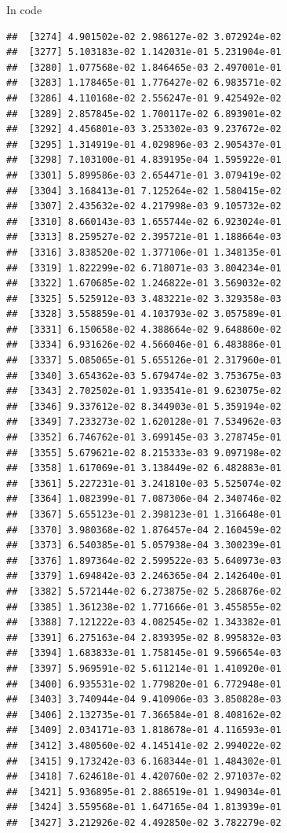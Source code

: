 \documentclass[ignorenonframetext,]{beamer}
\begin{document}
\begin{frame}[fragile]{In code}
\begin{verbatim}
##  [3274] 4.901502e-02 2.986127e-02 3.072924e-02
##  [3277] 5.103183e-02 1.142031e-01 5.231904e-01
##  [3280] 1.077568e-02 1.846465e-03 2.497001e-01
##  [3283] 1.178465e-01 1.776427e-02 6.983571e-02
##  [3286] 4.110168e-02 2.556247e-01 9.425492e-02
##  [3289] 2.857845e-02 1.700117e-02 6.893901e-02
##  [3292] 4.456801e-03 3.253302e-03 9.237672e-02
##  [3295] 1.314919e-01 4.029896e-03 2.905437e-01
##  [3298] 7.103100e-01 4.839195e-04 1.595922e-01
##  [3301] 5.899586e-03 2.654471e-01 3.079419e-02
##  [3304] 3.168413e-01 7.125264e-02 1.580415e-02
##  [3307] 2.435632e-02 4.217998e-03 9.105732e-02
##  [3310] 8.660143e-03 1.655744e-02 6.923024e-01
##  [3313] 8.259527e-02 2.395721e-01 1.188664e-03
##  [3316] 3.838520e-02 1.377106e-01 1.348135e-01
##  [3319] 1.822299e-02 6.718071e-03 3.804234e-01
##  [3322] 1.670685e-02 1.246822e-01 3.569032e-02
##  [3325] 5.525912e-03 3.483221e-02 3.329358e-03
##  [3328] 3.558859e-01 4.103793e-02 3.057589e-01
##  [3331] 6.150658e-02 4.388664e-02 9.648860e-02
##  [3334] 6.931626e-02 4.566046e-01 6.483886e-01
##  [3337] 5.085065e-01 5.655126e-01 2.317960e-01
##  [3340] 3.654362e-03 5.679474e-02 3.753675e-03
##  [3343] 2.702502e-01 1.933541e-01 9.623075e-02
##  [3346] 9.337612e-02 8.344903e-01 5.359194e-02
##  [3349] 7.233273e-02 1.620128e-01 7.534962e-03
##  [3352] 6.746762e-01 3.699145e-03 3.278745e-01
##  [3355] 5.679621e-02 8.215333e-03 9.097198e-02
##  [3358] 1.617069e-01 3.138449e-02 6.482883e-01
##  [3361] 5.227231e-01 3.241810e-03 5.525074e-02
##  [3364] 1.082399e-01 7.087306e-04 2.340746e-02
##  [3367] 5.655123e-01 2.398123e-01 1.316648e-01
##  [3370] 3.980368e-02 1.876457e-04 2.160459e-02
##  [3373] 6.540385e-01 5.057938e-04 3.300239e-01
##  [3376] 1.897364e-02 2.599522e-03 5.640973e-03
##  [3379] 1.694842e-03 2.246365e-04 2.142640e-01
##  [3382] 5.572144e-02 6.273875e-02 5.286876e-02
##  [3385] 1.361238e-02 1.771666e-01 3.455855e-02
##  [3388] 7.121222e-03 4.082545e-02 1.343382e-01
##  [3391] 6.275163e-04 2.839395e-02 8.995832e-03
##  [3394] 1.683833e-01 1.758145e-01 9.596654e-03
##  [3397] 5.969591e-02 5.611214e-01 1.410920e-01
##  [3400] 6.935531e-02 1.779820e-01 6.772948e-01
##  [3403] 3.740944e-04 9.410906e-03 3.850828e-03
##  [3406] 2.132735e-01 7.366584e-01 8.408162e-02
##  [3409] 2.034171e-03 1.818678e-01 4.116593e-01
##  [3412] 3.480560e-02 4.145141e-02 2.994022e-02
##  [3415] 9.173242e-03 6.168344e-01 1.484302e-01
##  [3418] 7.624618e-01 4.420760e-02 2.971037e-02
##  [3421] 5.936895e-01 2.886519e-01 1.949034e-01
##  [3424] 3.559568e-01 1.647165e-04 1.813939e-01
##  [3427] 3.212926e-02 4.492850e-02 3.782279e-02

\end{verbatim}
\end{frame}
\end{document}
